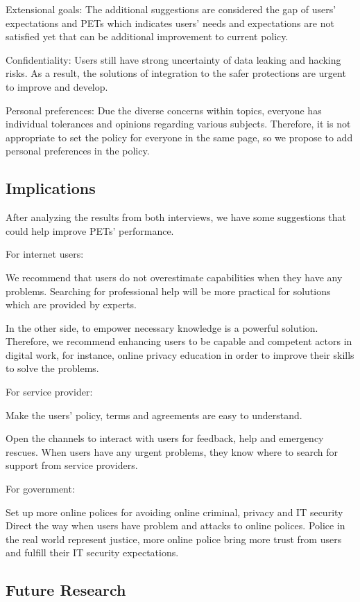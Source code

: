 Extensional goals: The additional suggestions are considered the gap of users’ expectations and PETs which indicates users’ needs and expectations are not satisfied yet that can be additional improvement to current policy. 

Confidentiality: Users still have strong uncertainty of data leaking and hacking risks. As a result, the solutions of integration to the safer protections are urgent to improve and develop. 

Personal preferences: Due the diverse concerns within topics, everyone has individual  tolerances and opinions regarding various subjects. Therefore, it is not appropriate to set the policy for everyone in the same page, so we propose to add personal preferences in the policy. 

\subsection{Implications}
\label{Label2}

After analyzing the results from both interviews, we have some suggestions that could help improve PETs’ performance. 

For internet users:  

We recommend that users do not overestimate capabilities when they have any problems. Searching for professional help will be more practical for solutions which are provided by experts. 

In the other side, to empower necessary knowledge is a powerful solution. Therefore, we recommend enhancing users to be capable and competent actors in digital work, for instance, online privacy education in order to improve their skills to solve the problems. 

For service provider: 

Make the users' policy, terms and agreements are easy to understand. 

Open the channels to interact with users for feedback, help and emergency rescues. When users have any urgent problems, they know where to search for support from service providers. 

For government: 

Set up more online polices for avoiding online criminal, privacy and IT security Direct the way when users have problem and attacks to online polices. Police in the real world represent justice, more online police bring more trust from users and fulfill their IT security expectations. 

\subsection{Future Research}
\label{Label2}


